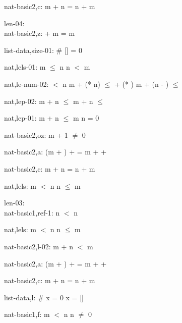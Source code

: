 \documentclass[a4paper]{article}
\begin{document}
nat-basic2,c: 
 \Fol m + n = n + m



\bigskip

len-04:\\ nat-basic2,z: 
  + m = m



list-data,size-01: 
 \Fol \# [] = 0



nat,lels-01: 
 \Fol \Not m $\le$ n \Equiv n $<$ m



nat,le-num-02: 
 $<$ n
 \Fol m + (* n) $\le$  + (* ) \Equiv m + (n - ) $\le$ 



nat,lep-02: 
 \Fol m + n $\le$ m +  \Equiv n $\le$ 



nat,lep-01: 
 \Fol m + n $\le$ m \Equiv n = 0



nat-basic2,oz: 
 \Fol m + 1 $\neq$ 0



nat-basic2,a: 
 \Fol (m + ) +  = m +  + 



nat-basic2,c: 
 \Fol m + n = n + m



nat,lels: 
 \Fol \Not m $<$ n \Equiv n $\le$ m



\bigskip

len-03:\\ nat-basic1,ref-1: 
 \Fol \Not n $<$ n



nat,lels: 
 \Fol \Not m $<$ n \Equiv n $\le$ m



nat-basic2,l-02: 
 \Fol \Not m + n $<$ m



nat-basic2,a: 
 \Fol (m + ) +  = m +  + 



nat-basic2,c: 
 \Fol m + n = n + m



list-data,l: 
 \Fol \# x = 0 \Equiv x = []



nat-basic1,f: 
 \Fol m $<$ n \Imp n $\neq$ 0
\end{document}
